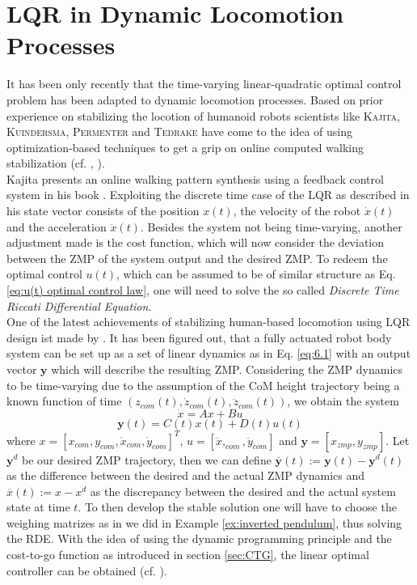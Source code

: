 \documentclass[paper=a4, pagesize, DIV=calc, BCOR=12.5mm, twoside=on, onecolumn=on, open = any, titlepage =on, parskip =half-, headsepline = on, footsepline = on, chapterprefix = on, appendixprefix = off, fontsize = 12pt, numbers = noenddot, abstract = on]{scrbook}
\numberwithin{equation}{chapter}
\theoremstyle{definition}
\theoremstyle{plain}
\theoremstyle{plain}
\theoremstyle{remark}
\theoremstyle{plain}
\theoremstyle{plain}
\begin{document}
\section{LQR in Dynamic Locomotion Processes}
It has been only recently that the time-varying linear-quadratic optimal control problem has been adapted to dynamic locomotion processes. Based on prior experience on stabilizing the locotion of humanoid robots scientists like \textsc{Kajita, Kuindersma, Permenter} and \textsc{Tedrake} have come to the idea of using optimization-based techniques to get a grip on online computed walking stabilization (cf. \cite[p.121]{kajita:2007}, \cite{kui:2014}).\\
Kajita presents an online walking pattern synthesis using a feedback control system in his book \cite{kajita:2007}. Exploiting the discrete time case of the LQR as described in \mbox{\cite[p.112]{li:2006}} his state vector consists of the position $x(t)$, the velocity of the robot $\dot{x}(t)$ and the acceleration $\ddot{x}(t)$. Besides the system not being time-varying, another adjustment made is the cost function, which will now consider the deviation between the ZMP of the system output and the desired ZMP. To redeem the optimal control $u(t)$, which can be assumed to be of similar structure as Eq. \eqref{eq:u(t) optimal control law}, one will need to solve the so called \emph{Discrete Time Riccati Differential Equation}.\\
One of the latest achievements of stabilizing human-based locomotion using LQR design ist made by \cite{kui:2014}. It has been figured out, that a fully actuated robot body system can be set up as a set of linear dynamics as in Eq. \eqref{eq:6.1} with an output vector $\mathbf{y}$ which will describe the resulting ZMP. Considering the ZMP dynamics to be time-varying due to the assumption of the CoM height trajectory being a known function of time $\left(z_{com}(t), \dot{z}_{com}(t), \ddot{z}_{com}(t)\right)$, we obtain the system
\begin{equation*}
\dot{x} = Ax + Bu
\end{equation*}
\begin{equation*}
\mathbf{y}(t) =  C(t)x(t) + D(t)u(t)
\end{equation*}
where $x=\left[ x_{com}, y_{com}, \dot{x}_{com}, \dot{y}_{com} \right]^T $, $u= \left[\ddot{x},_{com}, \ddot{y}_{com}\right]$ and $\mathbf{y} = \left[ x_{zmp}, y_{zmp}\right]$. Let $\mathbf{y}^d$ be our desired ZMP trajectory, then we can define $\overline{\mathbf{y}} (t) := \mathbf{y}(t) - \mathbf{y}^d(t)$ as the difference between the desired and the actual ZMP dynamics and $\overline{x}(t) := x - x^d$ as the discrepancy between the desired and the actual system state at time $t$. To then develop the stable solution one will have to choose the weighing matrizes as in we did in Example \ref{ex:inverted pendulum}, thus solving the RDE. With the idea of using the dynamic programming principle and the cost-to-go function as introduced in section \ref{sec:CTG}, the linear optimal controller can be obtained (cf. \cite{kui:2014}).
\end{document}
